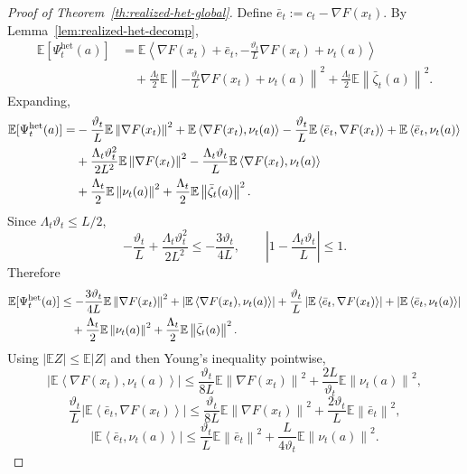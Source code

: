 \documentclass{article}
\theoremstyle{definition}
\newcommand{\EE}{\mathbb E}
\newcommand{\norm}[1]{\left\lVert #1\right\rVert}
\newcommand{\ip}[2]{\left\langle #1,#2\right\rangle}
\begin{document}
\begin{proof}[Proof of Theorem~\ref{th:realized-het-global}]
Define $\bar e_t:=c_t-\nabla F(x_t)$.
By Lemma~\ref{lem:realized-het-decomp},
\begin{align*}
\EE[\Psi_t^{\mathrm{het}}(a)]
&=
\EE\ip{\nabla F(x_t)+\bar e_t}{-\frac{\vartheta_t}{L}\nabla F(x_t)+\nu_t(a)}\\
&\quad+
\frac{\Lambda_t}{2}
\EE\left\|-\frac{\vartheta_t}{L}\nabla F(x_t)+\nu_t(a)\right\|^2
+
\frac{\Lambda_t}{2}\EE\norm{\bar\zeta_t(a)}^2.
\end{align*}
Expanding,
\begin{align*}
\EE[\Psi_t^{\mathrm{het}}(a)]
=
&-\frac{\vartheta_t}{L}\EE\norm{\nabla F(x_t)}^2
+\EE\ip{\nabla F(x_t)}{\nu_t(a)}
-\frac{\vartheta_t}{L}\EE\ip{\bar e_t}{\nabla F(x_t)}
+\EE\ip{\bar e_t}{\nu_t(a)}
\notag\\
&+
\frac{\Lambda_t\vartheta_t^2}{2L^2}\EE\norm{\nabla F(x_t)}^2
-
\frac{\Lambda_t\vartheta_t}{L}\EE\ip{\nabla F(x_t)}{\nu_t(a)}\\
&+
\frac{\Lambda_t}{2}\EE\norm{\nu_t(a)}^2
+
\frac{\Lambda_t}{2}\EE\norm{\bar\zeta_t(a)}^2.
\end{align*}
Since $\Lambda_t\vartheta_t\le L/2$,
\[
-\frac{\vartheta_t}{L}+\frac{\Lambda_t\vartheta_t^2}{2L^2}
\le
-\frac{3\vartheta_t}{4L},
\qquad
\left|1-\frac{\Lambda_t\vartheta_t}{L}\right|\le 1.
\]
Therefore
\begin{align}
\EE[\Psi_t^{\mathrm{het}}(a)]
&\le
-\frac{3\vartheta_t}{4L}\EE\norm{\nabla F(x_t)}^2
+
\left|\EE\ip{\nabla F(x_t)}{\nu_t(a)}\right|
+
\frac{\vartheta_t}{L}\left|\EE\ip{\bar e_t}{\nabla F(x_t)}\right|
+
\left|\EE\ip{\bar e_t}{\nu_t(a)}\right|
\notag\\
&\quad+
\frac{\Lambda_t}{2}\EE\norm{\nu_t(a)}^2
+
\frac{\Lambda_t}{2}\EE\norm{\bar\zeta_t(a)}^2.
\label{eq:realized-het-reduced}
\end{align}
Using $\left|\EE Z\right|\le \EE|Z|$
and then Young's inequality pointwise,
\begin{equation}
\left|\EE\ip{\nabla F(x_t)}{\nu_t(a)}\right|
\le
\frac{\vartheta_t}{8L}\EE\norm{\nabla F(x_t)}^2
+
\frac{2L}{\vartheta_t}\EE\norm{\nu_t(a)}^2,
\label{eq:realized-het-young1}\end{equation}
\[
\frac{\vartheta_t}{L}\left|\EE\ip{\bar e_t}{\nabla F(x_t)}\right|
\le
\frac{\vartheta_t}{8L}\EE\norm{\nabla F(x_t)}^2
+
\frac{2\vartheta_t}{L}\EE\norm{\bar e_t}^2,
\]
\begin{equation}
\left|\EE\ip{\bar e_t}{\nu_t(a)}\right|
\le
\frac{\vartheta_t}{L}\EE\norm{\bar e_t}^2
+
\frac{L}{4\vartheta_t}\EE\norm{\nu_t(a)}^2.
\label{eq:realized-het-young3}\end{equation}

\end{proof}
\end{document}
